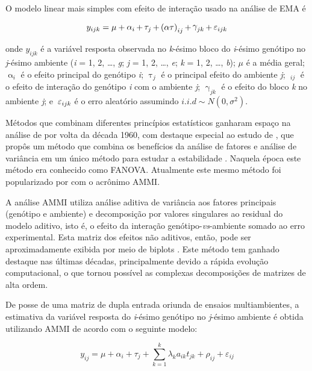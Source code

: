 \documentclass[
]{book}
\begin{document}
O modelo linear mais simples com efeito de interação usado na análise de EMA é

\[
{y_{ijk}} = {\rm{ }}\mu {\rm{ }} + \mathop \alpha \nolimits_i  + \mathop \tau \nolimits_j  + \mathop {(\alpha \tau )}\nolimits_{ij}  + \mathop \gamma \nolimits_{jk}  + {\rm{ }}\mathop \varepsilon \nolimits_{ijk}
\]

onde \({y_{ijk}}\) é a variável resposta observada no \emph{k}-ésimo bloco do \emph{i}-ésimo genótipo no \emph{j}-ésimo ambiente (\emph{i} = 1, 2, \ldots, \emph{g}; \emph{j} = 1, 2, \ldots, \emph{e}; \emph{k} = 1, 2, \ldots, \emph{b}); \(\mu\) é a média geral; \(\mathop\alpha\nolimits_i\) é o efeito principal do genótipo \emph{i}; \(\mathop \tau \nolimits_j\) é o principal efeito do ambiente \emph{j}; \(\mathop {(\alpha \tau )}\nolimits_{ij}\) é o efeito de interação do genótipo \emph{i} com o ambiente \emph{j}; \(\mathop \gamma \nolimits_{jk}\) é o efeito do bloco \emph{k} no ambiente \emph{j}; e \({\rm{ }}\mathop \varepsilon \nolimits_{ijk}\) é o erro aleatório assumindo \(i.i.d \sim N(0, \sigma^2 )\).

Métodos que combinam diferentes princípios estatísticos ganharam espaço na análise de  por volta da década 1960, com destaque especial ao estudo de \citet{Gollob1968}, que propôs um método que combina os benefícios da análise de fatores e análise de variância em um único método para estudar a estabilidade . Naquela época este método era conhecido como FANOVA. Atualmente este mesmo método foi popularizado por \citet{Gauch1988} com o acrônimo AMMI.

A análise AMMI utiliza análise aditiva de variância aos fatores principais (genótipo e ambiente) e decomposição por valores singulares ao residual do modelo aditivo, isto é, o efeito da interação genótipo-\emph{vs}-ambiente somado ao erro experimental. Esta matriz dos efeitos não aditivos, então, pode ser aproximadamente exibida por meio de biplots  \citet{Gabriel1971}. Este método tem ganhado destaque nas últimas décadas, principalmente devido a rápida evolução computacional, o que tornou possível as complexas decomposições de matrizes de alta ordem.

De posse de uma matriz de dupla entrada oriunda de ensaios multiambientes, a estimativa da variável resposta do \emph{i}-ésimo genótipo no \emph{j}-ésimo ambiente é obtida utilizando AMMI de acordo com o seguinte modelo:

\[
{y_{ij}} = \mu  + {\alpha_i} + {\tau_j} + \sum\limits_{k = 1}^k {{\lambda _k}{a_{ik}}} {t_{jk}} + {\rho _{ij}} + {\varepsilon _{ij}}
\]
\end{document}
